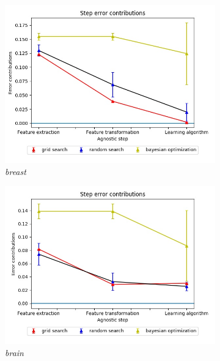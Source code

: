\begin{figure}[ht!]
\centering
\begin{subfigure}{.5\textwidth}
  \centering
  \includegraphics[scale=0.37]{img/EP/agnostic_error_steps_breast}
  \caption{\textit{breast}}
  \label{fig:eq_steps_breast}
\end{subfigure}%
\begin{subfigure}{.5\textwidth}
  \centering
  \includegraphics[scale=0.37]{img/EP/agnostic_error_step_brain}
  \caption{\textit{brain}}
  \label{fig:eq_step_brain}
\end{subfigure}
\begin{subfigure}{.5\textwidth}
  \centering

\end{subfigure}
\end{figure}
